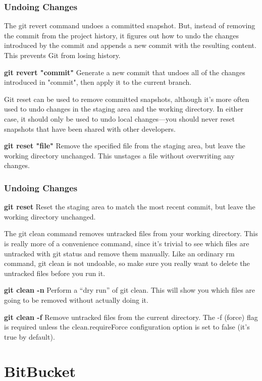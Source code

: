 \documentclass{beamer}
\begin{document}
\begin{frame}
\frametitle{Undoing Changes}
The git revert command undoes a committed snapshot. But, instead of removing the commit from the project history, it figures out how to undo the changes introduced by the commit and appends a new commit with the resulting content. This prevents Git from losing history.

		\textbf{git revert "commit"}
		Generate a new commit that undoes all of the changes introduced in "commit", then apply it to the current branch.

	
		Git reset can be used to remove committed snapshots, although it’s more often used to undo changes in the staging area and the working directory. In either case, it should only be used to undo local changes—you should never reset snapshots that have been shared with other developers.

		\textbf{git reset "file"}
		Remove the specified file from the staging area, but leave the working directory unchanged. This unstages a file without overwriting any changes.
\end{frame}

\begin{frame}
\frametitle{Undoing Changes}
        \textbf{git reset}
		Reset the staging area to match the most recent commit, but leave the working directory unchanged. 

	
		The git clean command removes untracked files from your working directory. This is really more of a convenience command, since it’s trivial to see which files are untracked with git status and remove them manually. Like an ordinary rm command, git clean is not undoable, so make sure you really want to delete the untracked files before you run it.

		\textbf{git clean -n}
		Perform a “dry run” of git clean. This will show you which files are going to be removed without actually doing it.

		\textbf{git clean -f}
		Remove untracked files from the current directory. The -f (force) flag is required unless the clean.requireForce configuration option is set to false (it's true by default).
\end{frame}


\section{BitBucket}
\end{document}
